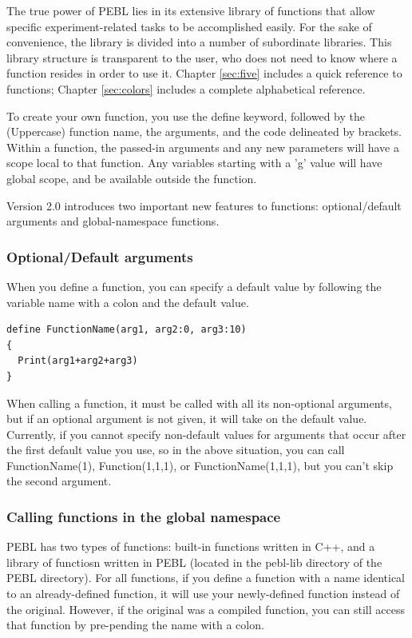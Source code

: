\vfill
{}

The true power of PEBL lies in its extensive library of
functions that allow specific experiment-related tasks to be
accomplished easily. For the sake of convenience, the library is divided into a number of subordinate libraries.  This library structure
is transparent to the user, who does not need to know where
a function resides in order to use it. Chapter \ref{sec:five} includes a quick reference to functions; Chapter \ref{sec:colors} includes a complete alphabetical reference.

To create your own function, you use the define keyword, followed by the (Uppercase) function name, the arguments, and the code delineated by brackets.  Within a function, the passed-in arguments and any new parameters will have a scope local to that function.  Any variables starting with a 'g' value will have global scope, and be available outside the function.

Version 2.0 introduces two important new features to functions: optional/default arguments and global-namespace functions.  

\subsubsection{Optional/Default arguments}  When you define a function, you can specify a default value by following the variable name with a colon and the default value.

\begin{verbatim}
define FunctionName(arg1, arg2:0, arg3:10)
{
  Print(arg1+arg2+arg3)
}
\end{verbatim}
When calling a function, it must be called with all its non-optional arguments, but if an optional argument is not given, it will take on the default value. Currently, if you cannot specify non-default values for arguments that occur after the first default value you use, so in the above situation, you can call FunctionName(1), Function(1,1,1), or FunctionName(1,1,1), but you can't skip the second argument.

\subsubsection{Calling functions in the global namespace}
PEBL has two types of functions: built-in functions written in C++, and a library of functiosn written in PEBL (located in the pebl-lib directory of the PEBL directory).  For all functions, if you define a function with a name identical to an already-defined function, it will use your newly-defined function instead of the original.  However, if the original was a compiled function, you can still access that function by pre-pending the name with a colon. 

